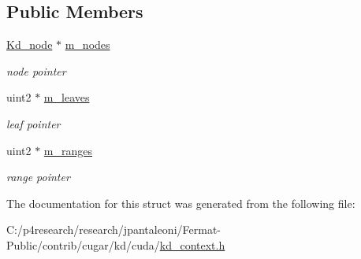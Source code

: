 \subsection*{Public Members}
\begin{DoxyCompactItemize}
\item 
\mbox{\label{structcugar_1_1cuda_1_1_kd__context_1_1_context_a2ef7ab3f73c3efbcf1889676cc49f147}} 
\hyperlink{structcugar_1_1_kd__node}{Kd\+\_\+node} $\ast$ \hyperlink{structcugar_1_1cuda_1_1_kd__context_1_1_context_a2ef7ab3f73c3efbcf1889676cc49f147}{m\+\_\+nodes}
\begin{DoxyCompactList}\small\item\em node pointer \end{DoxyCompactList}\item 
\mbox{\label{structcugar_1_1cuda_1_1_kd__context_1_1_context_a829a7e246b527d525e4f652afc60dcde}} 
uint2 $\ast$ \hyperlink{structcugar_1_1cuda_1_1_kd__context_1_1_context_a829a7e246b527d525e4f652afc60dcde}{m\+\_\+leaves}
\begin{DoxyCompactList}\small\item\em leaf pointer \end{DoxyCompactList}\item 
\mbox{\label{structcugar_1_1cuda_1_1_kd__context_1_1_context_a1b85cc5cdb6febf1e3256e5ed7f4db10}} 
uint2 $\ast$ \hyperlink{structcugar_1_1cuda_1_1_kd__context_1_1_context_a1b85cc5cdb6febf1e3256e5ed7f4db10}{m\+\_\+ranges}
\begin{DoxyCompactList}\small\item\em range pointer \end{DoxyCompactList}\end{DoxyCompactItemize}


The documentation for this struct was generated from the following file\+:\begin{DoxyCompactItemize}
\item 
C\+:/p4research/research/jpantaleoni/\+Fermat-\/\+Public/contrib/cugar/kd/cuda/\hyperlink{kd__context_8h}{kd\+\_\+context.\+h}\end{DoxyCompactItemize}
